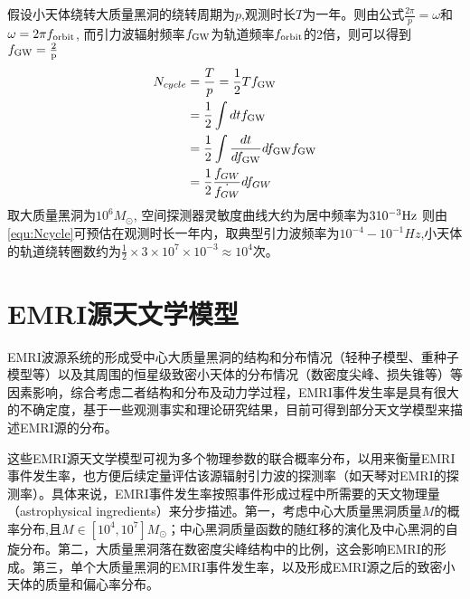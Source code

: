 假设小天体绕转大质量黑洞的绕转周期为$p$,观测时长$T$为一年。则由公式$\frac{2\pi}{p}=\omega$和$\omega=2\pi f_{\rm orbit}$, 而引力波辐射频率$f_{\rm GW}$为轨道频率$f_{\rm orbit}$的2倍，则可以得到$f_{\rm GW}=\frac{2}{\rm p}$
\begin{equation}
    \label{equ:Ncycle}
    \begin{split}
    N_{cycle}&= \frac{T}{p}=\frac{1}{2}Tf_{\rm GW}  \\
    &=\frac{1}{2}\int dt f_{\rm GW}   \\
    &=\frac{1}{2}\int \frac{dt}{df_{\rm GW}} df_{\rm GW} f_{\rm GW}  \\
    &=\frac{1}{2} \frac{f_{GW}}{\dot{f_{GW}}} df_{GW}
    \end{split}
\end{equation}
取大质量黑洞为$10^6M_{\odot}$, 空间探测器灵敏度曲线大约为居中频率为$3 10^{-3} \rm Hz$ 则由\autoref{equ:Ncycle}可预估在观测时长一年内，取典型引力波频率为$10^{-4}-10^{-1}Hz$,小天体的轨道绕转圈数约为$\frac{1}{2}\times 3\times 10^7\times  10^{-3} \approx 10^4$次。



\section{EMRI源天文学模型}
EMRI波源系统的形成受中心大质量黑洞的结构和分布情况（轻种子模型\cite{madau2001massive}、重种子模型等）以及其周围的恒星级致密小天体的分布情况（数密度尖峰、损失锥等）等因素影响，综合考虑二者结构和分布及动力学过程，EMRI事件发生率是具有很大的不确定度，基于一些观测事实和理论研究结果，目前可得到部分天文学模型来描述EMRI源的分布\cite{Fan:2020zhy,babak2017science}。

这些EMRI源天文学模型可视为多个物理参数的联合概率分布，以用来衡量EMRI事件发生率，也方便后续定量评估该源辐射引力波的探测率（如天琴对EMRI的探测率）。具体来说，EMRI事件发生率按照事件形成过程中所需要的天文物理量（astrophysical ingredients）\cite{babak2017science}来分步描述。第一，考虑中心大质量黑洞质量$M$的概率分布,且$M \in [10^4, 10^7] M_{\odot}$；中心黑洞质量函数的随红移的演化及中心黑洞的自旋分布。第二，大质量黑洞落在数密度尖峰结构中的比例，这会影响EMRI的形成。第三，单个大质量黑洞的EMRI事件发生率，以及形成EMRI源之后的致密小天体的质量和偏心率分布。

